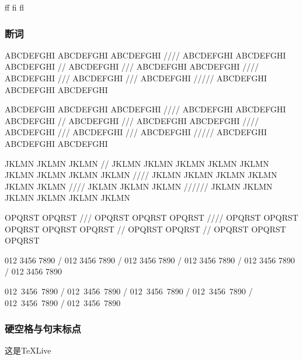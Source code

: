             f\mbox{}f f\mbox{}i f\mbox{}l %

        \subsubsection{断词}
            ABCDEFGHI ABCDEFGHI ABCDEFGHI //// ABCDEFGHI ABCDEFGHI ABCDEFGHI // ABCDEFGHI /// ABCDEFGHI ABCDEFGHI //// ABCDEFGHI /// ABCDEFGHI /// ABCDEFGHI ///// ABCDEFGHI ABCDEFGHI ABCDEFGHI

            ABCDEFGHI ABCDEFGHI ABCDEFGHI //// ABCDEFGHI ABCDEFGHI ABCDEFGHI // ABCDEFGHI /// ABCDEFGHI ABCDEFGHI //// ABCDEFGHI /// ABCDEFGHI /// ABCDEFGHI ///// ABCDEFGHI ABCDEFGHI ABCDEFGHI

            JKLMN JKLMN JKLMN // JKLMN JKLMN JKLMN JKLMN JKLMN JKLMN JKLMN JKLMN JKLMN //// JKLMN JKLMN JKLMN JKLMN JKLMN JKLMN //// JKLMN JKLMN JKLMN ////// JKLMN JKLMN JKLMN JKLMN JKLMN JKLMN

            OP\-QRS\-T OP\-QRS\-T /// OP\-QRS\-T OP\-QRS\-T OP\-QRS\-T //// OP\-QRS\-T OP\-QRS\-T OP\-QRS\-T OP\-QRS\-T OP\-QRS\-T // OP\-QRS\-T OP\-QRS\-T // OP\-QRS\-T OP\-QRS\-T OP\-QRS\-T 
         
            012 3456 7890 / 012 3456 7890 / 012 3456 7890 / 012 3456 7890 / 012 3456 7890 / 012 3456 7890

            \mbox{012 3456 7890} / \mbox{012 3456 7890} / \mbox{012 3456 7890} / \mbox{012 3456 7890} / \mbox{012 3456 7890} / \mbox{012 3456 7890}

        \subsubsection{硬空格与句末标点}
            这是\TeX Live %

